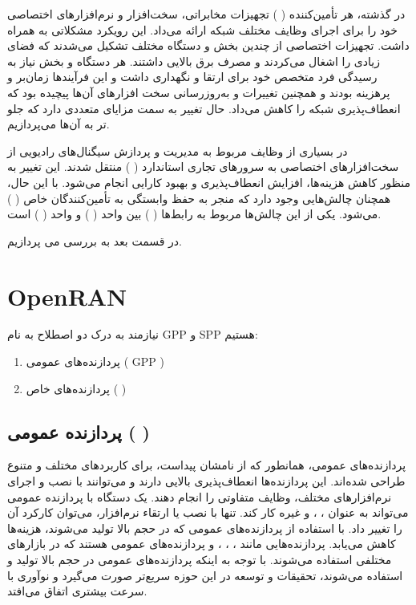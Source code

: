 \documentclass[landscape, 12pt]{report}
\begin{document}
در گذشته، هر تأمین‌کننده (
) تجهیزات مخابراتی، سخت‌افزار و نرم‌افزارهای اختصاصی خود را برای اجرای وظایف مختلف شبکه ارائه می‌داد. این رویکرد مشکلاتی به همراه داشت. تجهیزات اختصاصی از چندین بخش و دستگاه مختلف تشکیل می‌شدند که فضای زیادی را اشغال می‌کردند و مصرف برق بالایی داشتند. هر دستگاه و بخش نیاز به رسیدگی فرد متخصص خود برای ارتقا و نگهداری داشت و این فرآیندها زمان‌بر و پرهزینه بودند و همچنین تغییرات و به‌روزرسانی سخت افزارهای‌ آن‌ها پیچیده بود که انعطاف‌پذیری شبکه را کاهش می‌داد. حال تغییر به سمت
 مزایای متعددی دارد که جلو تر به آن‌ها می‌پردازیم.

در
  بسیاری از وظایف مربوط به مدیریت و پردازش سیگنال‌های رادیویی از سخت‌افزارهای اختصاصی به سرورهای تجاری استاندارد (
  ) منتقل شدند. این تغییر به منظور کاهش هزینه‌ها، افزایش انعطاف‌پذیری و بهبود کارایی انجام می‌شود. با این حال، همچنان چالش‌هایی وجود دارد که منجر به حفظ وابستگی به تأمین‌کنندگان خاص (
  ) می‌شود. یکی از این چالش‌ها مربوط به رابط‌ها (
  ) بین واحد  (
  ) و واحد (
  )  است.
  
  
  در قسمت بعد به بررسی 
  می پردازیم.
  
  \chapter*{OpenRAN}
  نیازمند به درک دو اصطلاح به نام
   GPP
    و
     SPP
      هستیم:
 \begin{enumerate}
 	\item پردازنده‌های عمومی (
 	{GPP}
 	)
 	\item پردازنده‌های خاص (
 	)
 \end{enumerate}
 	\section*{پردازنده عمومی (
 		)}
 		
 	پردازنده‌های عمومی، همانطور که از نامشان پیداست، برای کاربردهای مختلف و متنوع طراحی شده‌اند. این پردازنده‌ها انعطاف‌پذیری بالایی دارند و می‌توانند با نصب و اجرای نرم‌افزارهای مختلف، وظایف متفاوتی را انجام دهند. یک دستگاه با پردازنده عمومی می‌تواند به عنوان
 	 ،
 	  ،
 	    و غیره کار کند. تنها با نصب یا ارتقاء نرم‌افزار، می‌توان کارکرد آن را تغییر داد. با استفاده از پردازنده‌های عمومی که در حجم بالا تولید می‌شوند، هزینه‌ها کاهش می‌یابد. پردازنده‌هایی مانند
 	     ،
 	      ،
 	       ،
 	        و
 	         پردازنده‌های عمومی هستند که در بازارهای مختلفی استفاده می‌شوند. با توجه به اینکه پردازنده‌های عمومی در حجم بالا تولید و استفاده می‌شوند، تحقیقات و توسعه در این حوزه سریع‌تر صورت می‌گیرد و نوآوری با سرعت بیشتری اتفاق می‌افتد.
 	         
\end{document}
